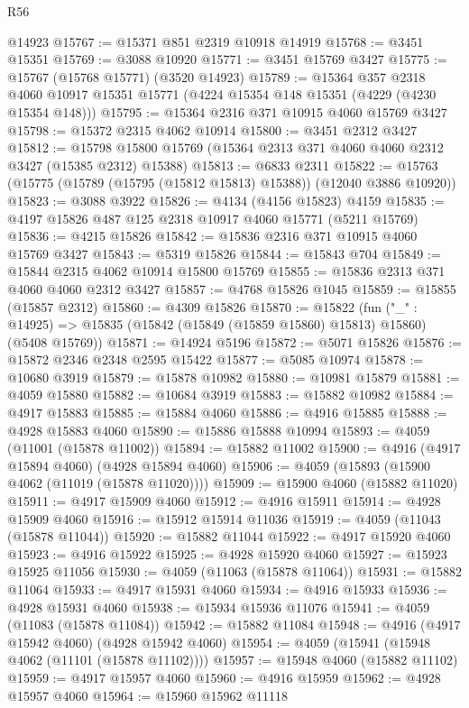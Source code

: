 \begin{lexlean}{R56}
\begin{coremodule}
    @14923
@15767 := @15371 @851 @2319 @10918 @14919
@15768 := @3451 @15351
@15769 := @3088 @10920
@15771 := @3451 @15769 @3427
@15775 := @15767 (@15768 @15771) (@3520 @14923)
@15789 := @15364
    @357
    @2318
    @4060
    @10917
    @15351
    @15771
    (@4224 @15354 @148 @15351 (@4229 (@4230 @15354 @148)))
@15795 := @15364 @2316 @371 @10915 @4060 @15769 @3427
@15798 := @15372 @2315 @4062 @10914
@15800 := @3451 @2312 @3427
@15812 := @15798 @15800 @15769 (@15364 @2313 @371 @4060 @4060 @2312 @3427 (@15385 @2312) @15388)
@15813 := @6833 @2311
@15822 := @15763 (@15775 (@15789 (@15795 (@15812 @15813) @15388)) (@12040 @3886 @10920))
@15823 := @3088 @3922
@15826 := @4134 (@4156 @15823) @4159
@15835 := @4197 @15826 @487 @125 @2318 @10917 @4060 @15771 (@5211 @15769)
@15836 := @4215 @15826
@15842 := @15836 @2316 @371 @10915 @4060 @15769 @3427
@15843 := @5319 @15826
@15844 := @15843 @704
@15849 := @15844 @2315 @4062 @10914 @15800 @15769
@15855 := @15836 @2313 @371 @4060 @4060 @2312 @3427
@15857 := @4768 @15826 @1045
@15859 := @15855 (@15857 @2312)
@15860 := @4309 @15826
@15870 := @15822
    (fun ("_" : @14925) => @15835 (@15842 (@15849 (@15859 @15860) @15813) @15860) (@5408 @15769))
@15871 := @14924 @5196
@15872 := @5071 @15826
@15876 := @15872 @2346 @2348 @2595 @15422
@15877 := @5085 @10974
@15878 := @10680 @3919
@15879 := @15878 @10982
@15880 := @10981 @15879
@15881 := @4059 @15880
@15882 := @10684 @3919
@15883 := @15882 @10982
@15884 := @4917 @15883
@15885 := @15884 @4060
@15886 := @4916 @15885
@15888 := @4928 @15883 @4060
@15890 := @15886 @15888 @10994
@15893 := @4059 (@11001 (@15878 @11002))
@15894 := @15882 @11002
@15900 := @4916 (@4917 @15894 @4060) (@4928 @15894 @4060)
@15906 := @4059 (@15893 (@15900 @4062 (@11019 (@15878 @11020))))
@15909 := @15900 @4060 (@15882 @11020)
@15911 := @4917 @15909 @4060
@15912 := @4916 @15911
@15914 := @4928 @15909 @4060
@15916 := @15912 @15914 @11036
@15919 := @4059 (@11043 (@15878 @11044))
@15920 := @15882 @11044
@15922 := @4917 @15920 @4060
@15923 := @4916 @15922
@15925 := @4928 @15920 @4060
@15927 := @15923 @15925 @11056
@15930 := @4059 (@11063 (@15878 @11064))
@15931 := @15882 @11064
@15933 := @4917 @15931 @4060
@15934 := @4916 @15933
@15936 := @4928 @15931 @4060
@15938 := @15934 @15936 @11076
@15941 := @4059 (@11083 (@15878 @11084))
@15942 := @15882 @11084
@15948 := @4916 (@4917 @15942 @4060) (@4928 @15942 @4060)
@15954 := @4059 (@15941 (@15948 @4062 (@11101 (@15878 @11102))))
@15957 := @15948 @4060 (@15882 @11102)
@15959 := @4917 @15957 @4060
@15960 := @4916 @15959
@15962 := @4928 @15957 @4060
@15964 := @15960 @15962 @11118

\end{coremodule}
\end{lexlean}
